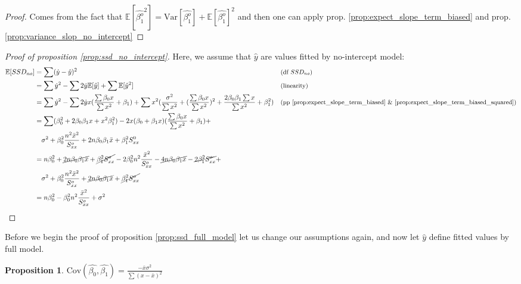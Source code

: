 \documentclass[12pt,a4paper,oneside]{book} %
\newtheorem{proposition}[theorem]{Proposition}
\newcommand{\E}{\mathbb{E}}
\newcommand{\Var}{\mathrm{Var}}
\newcommand{\Cov}{\mathrm{Cov}}
\begin{document}
\begin{proof}
	Comes from the fact that $\E [\hat{\beta_1^o} ^2] = \Var [\hat{\beta_1^o}] + \E [\hat{\beta_1^o}]^2 $ and then one can apply prop. \ref{prop:expect_slope_term_biased} and prop. \ref{prop:variance_slop_no_intercept}
\end{proof}


\begin{proof}[Proof of proposition \ref{prop:ssd_no_intercept}]
Here, we assume that $\hat{y}$ are values fitted by no-intercept model:
\begin{align*}
	\E[SSD_{no}] &= \sum (\dot{y} - \hat{y})^2   && \text{\small{(df $SSD_{no}$)}}\\
	&=  \sum \dot{y}^2 - \sum 2 \dot{y} \E [\hat{y}] + \sum \E [\hat{y}^2] && \text{\small{(linearity)}} \\
	& = \sum \dot{y}^2 - \sum 2 \dot{y} x(\frac{\sum \beta_0 x }{\sum x^2} + \beta_1) + \sum x^2 ( \frac{\sigma^2}{\sum x^2}+(\frac{\sum \beta_0 x }{\sum x^2})^2 + \frac{2 \beta_0 \beta_1 \sum x}{\sum x^2} + \beta_1^2) && \text{\small{(pp \ref{prop:expect_slope_term_biased} \& \ref{prop:expect_slope_term_biased_squared})}}\\
	&= \sum (\beta_0^2 + 2 \beta_0 \beta_1 x + x^2 \beta_1^2) - 2x(\beta_0+\beta_1x)(\frac{\sum \beta_0 x }{\sum x^2} + \beta_1)+ \\
	& \quad \sigma^2+\beta_0^2\frac{n^2\bar{x}^2}{S_{xx}^o}+2n\beta_0\beta_1\bar{x}+\beta_1^2S_{xx}^0 \\
	&= n \beta_0^2 + \cancel{2n\beta_0\beta_1\bar{x}}+\cancel{\beta_1^2S_{xx}^o}-2\beta_0^2n^2\frac{\bar{x}^2}{S_{xx}^o}-\cancel{4n\beta_0\beta_1\bar{x}}-\cancel{2\beta_1^2S_{xx}^o}+ \\
	& \quad \sigma^2+\beta^2_0 \frac{n^2 \bar{x}^2}{S_{xx}^o}+\cancel{2n\beta_0\beta_1\bar{x}}+\cancel{\beta_1^2S_{xx}^o} \\
	&= n\beta_0^2-\beta_0^2 n^2 \frac{\bar{x}^2}{S_{xx}^o}+ \sigma^2
\end{align*}

\end{proof}
	
	
Before we begin the proof of proposition \ref{prop:ssd_full_model} let us change our assumptions again, and now let $\hat{y}$ define fitted values by full model.

\begin{proposition} \label{prop:covariance_slope_intercept}
	$\Cov (\hat{\beta_0},\hat{\beta_1})= \frac{-\bar{x} \sigma^2}{\sum (x-\bar{x})^2}$
\end{proposition}
	
\end{document}
